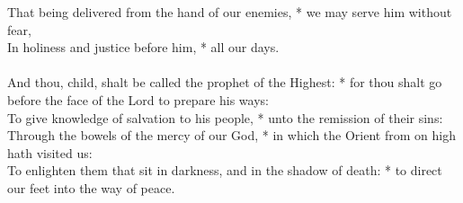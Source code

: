 \begin{Parallel}[v]{\colw}{\colx}
{{That being delivered from the hand of our enemies, * we may serve him without fear,\\
In holiness and justice before him, * all our days.\\ \\
And thou, child, shalt be called the prophet of the Highest: * for thou shalt go before the face of the Lord to prepare his ways:\\
To give knowledge of salvation to his people, * unto the remission of their sins:\\
Through the bowels of the mercy of our God, * in which the Orient from on high hath visited us:\\
To enlighten them that sit in darkness, and in the shadow of death: * to direct our feet into the way of peace.}}

\end{Parallel}



